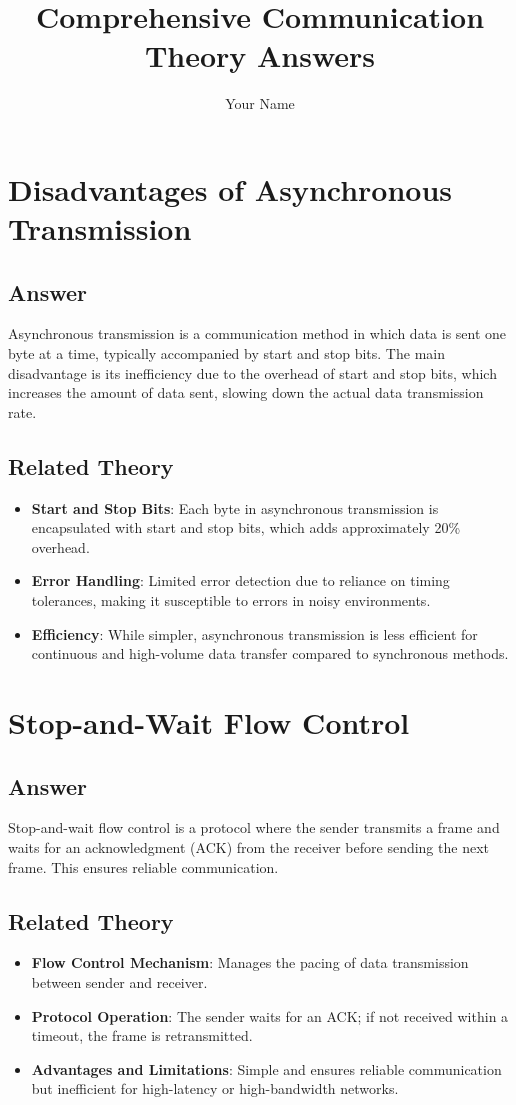 \documentclass{article}
\title{Comprehensive Communication Theory Answers}
\author{Your Name}
\date{}
\begin{document}
\maketitle

\section{Disadvantages of Asynchronous Transmission}
\subsection{Answer}
Asynchronous transmission is a communication method in which data is sent one byte at a time, typically accompanied by start and stop bits. The main disadvantage is its inefficiency due to the overhead of start and stop bits, which increases the amount of data sent, slowing down the actual data transmission rate. 

\subsection{Related Theory}
\begin{itemize}
    \item \textbf{Start and Stop Bits}: Each byte in asynchronous transmission is encapsulated with start and stop bits, which adds approximately 20\% overhead.
    \item \textbf{Error Handling}: Limited error detection due to reliance on timing tolerances, making it susceptible to errors in noisy environments.
    \item \textbf{Efficiency}: While simpler, asynchronous transmission is less efficient for continuous and high-volume data transfer compared to synchronous methods.
\end{itemize}

\section{Stop-and-Wait Flow Control}
\subsection{Answer}
Stop-and-wait flow control is a protocol where the sender transmits a frame and waits for an acknowledgment (ACK) from the receiver before sending the next frame. This ensures reliable communication.

\subsection{Related Theory}
\begin{itemize}
    \item \textbf{Flow Control Mechanism}: Manages the pacing of data transmission between sender and receiver.
    \item \textbf{Protocol Operation}: The sender waits for an ACK; if not received within a timeout, the frame is retransmitted.
    \item \textbf{Advantages and Limitations}: Simple and ensures reliable communication but inefficient for high-latency or high-bandwidth networks.
\end{itemize}
\end{document}
